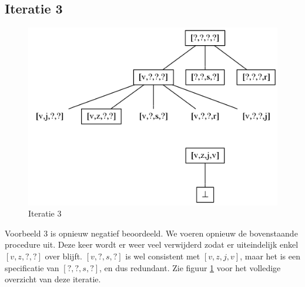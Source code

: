 \documentclass[alternative-exam.tex]{subfiles}
\begin{document}
\subsection{Iteratie 3}
\begin{figure}
[H]
\centering
\caption{Iteratie 3}
\label{iter_3}
\includegraphics[scale=0.5]{resources/graphs/iteration_3.png}
\end{figure}
Voorbeeld $3$ is opnieuw negatief beoordeeld. We voeren opnieuw de bovenstaande procedure uit. Deze keer wordt er weer veel verwijderd zodat er uiteindelijk enkel $[v,z,?,?]$ over blijft. $[v,?,s,?]$ is wel consistent met $[v,z,j,v]$, maar het is een specificatie van $[?,?,s,?]$, en dus redundant. Zie figuur \ref{iter_3} voor het volledige overzicht van deze iteratie.
\end{document}
